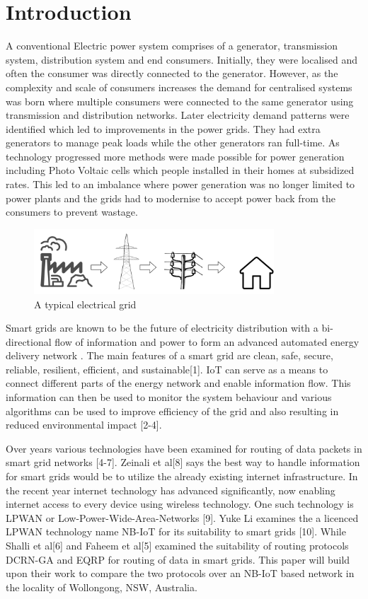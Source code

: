 \chapter{Introduction}\label{introduction} %

A conventional Electric power system comprises of a generator, transmission system, distribution system and end consumers. Initially, they were localised and often the consumer was directly connected to the generator. However, as the complexity and scale of consumers increases the demand for centralised systems was born where multiple consumers were connected to the same generator using transmission and distribution networks. Later electricity demand patterns were identified which led to improvements in the power grids. They had extra generators to manage peak loads while the other generators ran full-time. As technology progressed more methods were made possible for power generation including Photo Voltaic cells which people installed in their homes at subsidized rates. This led to an imbalance where power generation was no longer limited to power plants and the grids had to modernise to accept power back from the consumers to prevent wastage.

\begin{figure}[h]
    \centering
    \includegraphics[width=0.8\textwidth]{ElectricalGrid.png}
    \caption{A typical electrical grid}
    \label{fig:ElectricalGrid}
\end{figure}

Smart grids are known to be the future of electricity distribution with a bi-directional flow of information and power to form an advanced automated energy delivery network \citep{RN6}. The main features of a smart grid are clean, safe, secure, reliable, resilient, efficient, and sustainable[1]. IoT can serve as a means to connect different parts of the energy network and enable information flow. This information can then be used to monitor the system behaviour and various algorithms can be used to improve efficiency of the grid and also resulting in reduced environmental impact [2-4].

Over years various technologies have been examined for routing of data packets in smart grid networks [4-7]. Zeinali et al[8] says the best way to handle information for smart grids would be to utilize the already existing internet infrastructure. In the recent year internet technology has advanced significantly, now enabling internet access to every device using wireless technology. One such technology is LPWAN or Low-Power-Wide-Area-Networks [9]. Yuke Li examines the a licenced LPWAN technology name NB-IoT for its suitability to smart grids [10]. While Shalli et al[6] and Faheem et al[5] examined the suitability of routing protocols DCRN-GA and EQRP for routing of data in smart grids. This paper will build upon their work to compare the two protocols over an NB-IoT based network in the locality of Wollongong, NSW, Australia.
